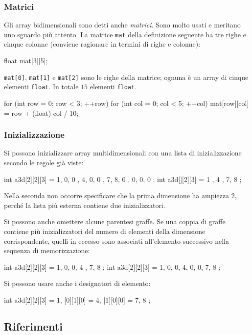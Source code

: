 \documentclass[11pt,a4paper]{article}
\begin{document}
\subsubsection{Matrici}

Gli array bidimensionali sono detti anche \emph{matrici}. Sono molto usati e meritano uno sguardo più attento. La matrice \lstinline|mat| della definizione seguente ha tre righe e cinque colonne (conviene ragionare in termini di righe e colonne):
\begin{codice}
float mat[3][5];
\end{codice}
\lstinline|mat[0]|, \lstinline|mat[1]| e \lstinline|mat[2]| sono le righe della matrice; ognuna è un array di cinque elementi \lstinline|float|. In totale $15$ elementi \lstinline|float|.
\begin{codice}
for (int row = 0; row < 3; ++row)
    for (int col = 0; col < 5; ++col)
        mat[row][col] = row + (float) col / 10;
\end{codice}

\subsubsection{Inizializzazione}

Si possono inizializzare array multidimensionali con una lista di inizializzazione secondo le regole già viste:
\begin{codice}
int a3d[2][2][3] = { { { 1, 0, 0 }, { 4, 0, 0 } }, { { 7, 8, 0 }, { 0, 0, 0 } } };
int a3d[][2][3]  = { { { 1 }, { 4 } }, { { 7, 8 } } };
\end{codice}
Nella seconda non occorre specificare che la prima dimensione ha ampiezza $2$, perché la lista più esterna contiene due inizializzatori.

Si possono anche omettere alcune parentesi graffe. Se una coppia di graffe contiene più inizializzatori del numero di elementi della dimensione corrispondente, quelli in eccesso sono associati all'elemento successivo nella sequenza di memorizzazione:
\begin{codice}
int a3d[2][2][3] = { { 1, 0, 0, 4 }, { 7, 8 } };
int a3d[2][2][3] = { 1, 0, 0, 4, 0, 0, 7, 8 };
\end{codice}
Si possono usare anche i designatori di elemento:
\begin{codice}
int a3d[2][2][3] = { 1, [0][1][0] = 4, [1][0][0] = 7, 8 };
\end{codice}

\subsection{Riferimenti}
\end{document}

